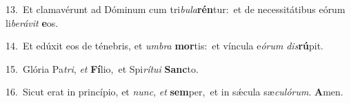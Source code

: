 {\numbfont\textcolor{\numbcolor}{13.}}~Et clamavérunt ad Dóminum cum tri\-\textit{bu}\-\textit{la}\textbf{rén}tur:~\star et de necessitátibus eórum li\-\textit{be}\-\textit{rá}\textit{vit} \textbf{e}\-os.\par
{\numbfont\textcolor{\numbcolor}{14.}}~Et edúxit eos de ténebris, et \textit{um}\-\textit{bra} \textbf{mor}\-tis:~\star et víncula e\-\textit{ó}\-\textit{rum} \textit{dis}\-\textbf{rú}pit.\par
{\numbfont\textcolor{\numbcolor}{15.}}~Glória Pa\-\textit{tri}\-, \textit{et} \textbf{Fí}\-lio,~\star et Spi\-\textit{rí}\-\textit{tu}\textit{i} \textbf{Sanc}\-to.\par
{\numbfont\textcolor{\numbcolor}{16.}}~Sicut erat in princípio, et \textit{nunc}\-, \textit{et} \textbf{sem}\-per,~\star et in sǽcula sæ\-\textit{cu}\-\textit{ló}\textit{rum}. \textbf{A}\-men.\par
